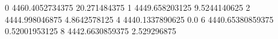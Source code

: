 0 4460.4052734375 20.271484375
1 4449.658203125 9.5244140625
2 4444.998046875 4.8642578125
4 4440.1337890625 0.0
6 4440.65380859375 0.52001953125
8 4442.6630859375 2.529296875
